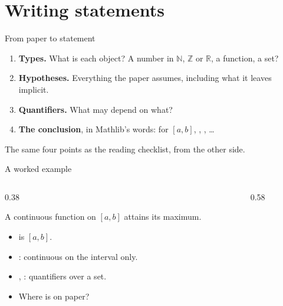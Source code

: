 \documentclass[10pt, aspectratio=169]{beamer}
\begin{document}
\section{Writing statements}

\begin{frame}[fragile]{From paper to statement}
\begin{enumerate}
\item \textbf{Types.} What is each object? A number in $\mathbb{N}$, $\mathbb{Z}$ or $\mathbb{R}$, a function, a set?
\item \textbf{Hypotheses.} Everything the paper assumes, including what it leaves implicit.
\item \textbf{Quantifiers.} What may depend on what?
\item \textbf{The conclusion}, in Mathlib's words:  for $[a,b]$, , , \dots
\end{enumerate}

\vspace{0.6em}
\begin{keypoint}
\normalsize The same four points as the reading checklist, from the other side.
\end{keypoint}
\end{frame}

\begin{frame}[fragile]{A worked example\livedemo}
\begin{columns}[T]
\begin{column}{0.38\textwidth}
\begin{paper}[Theorem]
A continuous function on $[a, b]$ attains its maximum.
\end{paper}

\begin{itemize}
\item {} is $[a, b]$.
\item {}: continuous on the interval only.
\item {}, : quantifiers over a set.
\item Where is  on paper?
\end{itemize}
\end{column}
\begin{column}{0.58\textwidth}
\leanlabel
{}
\end{column}
\end{columns}
\end{frame}
\end{document}
